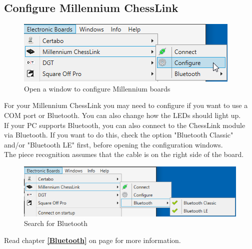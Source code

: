 \documentclass[11pt,a4paper]{article}
\begin{document}
\subsection{Configure Millennium ChessLink} \label{ConfigureChessLink}
\begin{figure}[H]
	\centering
	\includegraphics[scale=1.0]{MillenniumChessLink1.png}
	\caption{Open a window to configure Millennium boards }
	\label{fig:MillenniumChessLink1}
\end{figure}

For your Millennium ChessLink you may need to configure if you want to use a COM port or Bluetooth. You can also change how the LEDs should light up.\\
If your PC supports Bluetooth, you can also connect to the ChessLink module via Bluetooth. If you want to do this, check the option "Bluetooth Classic" and/or "Bluetooth LE" first, before opening the configuration windows.\\
The piece recognition assumes that the cable is on the right side of the board.

\begin{figure}[H]
	\centering
	\includegraphics[scale=0.8]{MillenniumChessLink9.png}
	\caption{Search for Bluetooth }
	\label{fig:MillenniumChessLink9}
\end{figure}
Read chapter \textbf{\ref{Bluetooth}  } on page \pageref{Bluetooth} for more information.
\end{document}
